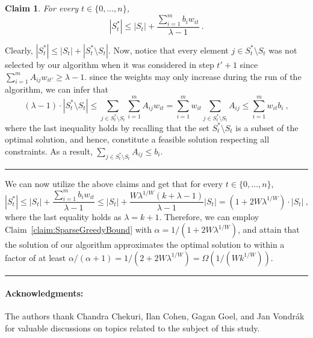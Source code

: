 \documentclass[11pt]{article}
\theoremstyle{plain}
\newtheorem{claim}[theorem]{Claim}
\theoremstyle{definition}
\newcommand{\qedsymb}{\hfill{\rule{2mm}{2mm}}}
\renewenvironment{proof}{\begin{trivlist} \item[\hspace{\labelsep}{\bf \noindent Proof.\/}] }{\qedsymb\end{trivlist}}\newenvironment{proofof}[1]{\begin{trivlist} \item[\hspace{\labelsep}{\bf \noindent Proof of #1.\/}] }{\qedsymb\end{trivlist}}\newenvironment{MyEqn}[1]{\setlength\arraycolsep{2pt}\begin{eqnarray*} #1}{\end{eqnarray*}}
\begin{document}
\begin{proofof}{Theorem~\ref{th:MainResult4}}
\begin{claim}
For every $t \in \{0, \ldots, n\}$,
$$
|S^*_t| \leq |S_t| + \frac{\sum_{i=1}^{m} b_i w_{it}}{\lambda - 1}
\ .
$$
\end{claim}
\begin{proof}
Clearly, $|S^*_t| \leq |S_t| + |S^*_t \setminus S_t|$. Now, notice
that every element $j \in S^*_t \setminus S_t$ was not selected by
our algorithm when it was considered in step $t'+1$ since
$\sum_{i=1}^{m} A_{i j} w_{i t'} \geq \lambda - 1$. since the
weights may only increase during the run of the algorithm, we can
infer that
$$
(\lambda - 1) \cdot |S^*_t \setminus S_t| \leq \sum_{j \in S^*_t
\setminus S_t} \sum_{i=1}^{m} A_{i j} w_{i t} = \sum_{i=1}^{m}
w_{i t} \sum_{j \in S^*_t \setminus S_t} A_{i j} \leq
\sum_{i=1}^{m} w_{i t} b_i \ ,
$$
where the last inequality holds by recalling that the set $S^*_t
\setminus S_t$ is a subset of the optimal solution, and hence,
constitute a feasible solution respecting all constraints. As a
result, $\sum_{j \in S^*_t \setminus S_t} A_{ij} \leq b_i$.~
\end{proof}

We can now utilize the above claims and get that for every $t \in
\{0, \ldots, n\}$,
$$
|S^*_t| \leq |S_t| + \frac{\sum_{i=1}^{m} b_i w_{it}}{\lambda - 1}
\leq |S_t| + \frac{W \lambda^{1/W} (k + \lambda - 1)}{\lambda - 1}
|S_t| = \left(1 + 2W\lambda^{1/W}\right) \cdot |S_t| \ ,
$$
where the last equality holds as $\lambda = k+1$. Therefore, we
can employ Claim~\ref{claim:SparseGreedyBound} with $\alpha = 1 /
(1 + 2W\lambda^{1/W})$, and attain that the solution of our
algorithm approximates the optimal solution to within a factor of
at least $\alpha/ (\alpha + 1) = 1 / (2 + 2W\lambda^{1/W}) =
\Omega(1/(Wk^{1/W}))$.~
\end{proofof}


\paragraph{Acknowledgments:}
The authors thank Chandra Chekuri, Ilan Cohen, Gagan Goel, and Jan
Vondr{\'a}k for valuable discussions on topics related to the
subject of this study.
\end{document}
